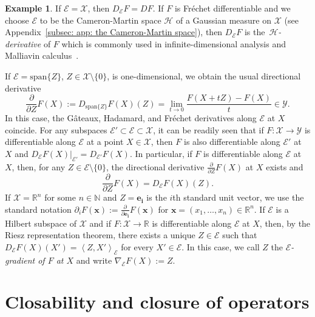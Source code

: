 \documentclass[namedate,webpdf]{ima-authoring-template-blank}
\newcommand*{\spn}{\mathrm{span}}
\newcommand*{\ip}[2]{\left\langle #1, #2 \right\rangle}
\newcounter{counter}
\numberwithin{counter}{section}
\numberwithin{equation}{section}
\theoremstyle{plain}
\theoremstyle{definition}
\newtheorem{example}[counter]{Example}
\newcommand*{\cE}{\mathcal{E}}
\newcommand*{\cH}{\mathcal{H}}
\newcommand*{\cX}{\mathcal{X}}
\newcommand*{\cY}{\mathcal{Y}}
\newcommand*{\bbN}{\mathbb{N}}
\newcommand*{\bbR}{\mathbb{R}}
\theoremstyle{thmstyletwo}
\begin{document}
\begin{example}
    If \(\cE = \cX\), then \(D_{\cE} F = D F\). If \(F\) is Fréchet differentiable and we choose \(\cE\) to be the Cameron-Martin space \(\cH\) of a Gaussian measure on \(\cX\) (see Appendix~\ref{subsec: app: the Cameron-Martin space}), then \(D_{\cE} F\) is the~\emph{\(\cH\)-derivative} of \(F\) which is commonly used in infinite-dimensional analysis and Malliavin calculus~\citep[see][]{bogachev_GaussianMeasures_1998,daprato_IntroductionStochasticAnalysisMalliavin_2014,lunardi_InfiniteDimensionalAnalysis_2015}.
\end{example}

If \(\cE = \spn\{Z\}\), \(Z \in \cX \setminus \{0\}\), is one-dimensional, we obtain the usual directional derivative
\[
\frac{\partial}{\partial Z} F(X) 
:= D_{\spn\{Z\}} F(X)(Z)
=  \lim_{t \to 0} \frac{F(X + t Z) - F(X)}{t} \in \cY.
\]
In this case, the G\^ateaux, Hadamard, and Fréchet derivatives along \(\cE\) at \(X\) coincide.
For any subspaces \(\cE' \subset \cE \subset \cX\), it can be readily seen that if \(F: \cX \to \cY\) is differentiable along \(\cE\) at a point \(X \in \cX\), then \(F\) is also differentiable along \(\cE'\) at \(X\) and 
\(
D_{\cE} F(X) |_{\cE'} = D_{\cE'} F(X).
\)
In particular, if \(F\) is differentiable along \(\cE\) at \(X\), then, for any \(Z \in \cE \setminus \{0\}\), the directional derivative \(\frac{\partial}{\partial Z} F(X)\) at \(X\) exists and
\[
\frac{\partial}{\partial Z} F(X) = D_{\cE} F(X)(Z).
\]
If \(\cX = \bbR^n\) for some \( n \in \bbN \) and \(Z = \bm{e_i}\) is the \(i\)th standard unit vector, we use the standard notation \(\partial_i F(\bm{x}) := \frac{\partial}{\partial \bm{e_i}} F(\bm{x})\) for \(\bm{x} = (x_1, \dots, x_n) \in \bbR^n\).
If \(\cE\) is a Hilbert subspace of \(\cX\) and if \(F: \cX \to \bbR\) is differentiable along \(\cE\) at \(X\), then, by the Riesz representation theorem, there exists a unique \(Z \in \cE\) such that \(D_{\cE} F(X)(X') = \ip{Z}{X'}_{\cE}\) for every \(X' \in \cE\). In this case, we call \(Z\) the \emph{\(\cE\)-gradient of \(F\) at \(X\)} and write
\(
\nabla_{\cE} F(X) := Z.
\)



\section{Closability and closure of operators}
\label{sec: app: closability and closure of operators}
\end{document}

